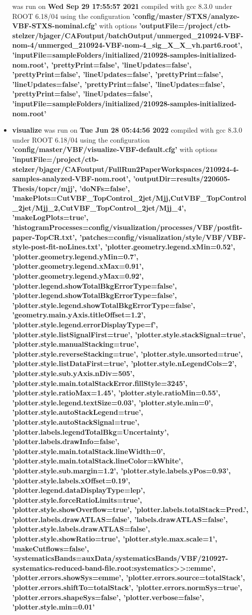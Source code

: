 \documentclass{article}
\begin{document}
\begin{itemize}
was run on \textbf{Wed Sep 29 17:55:57 2021} compiled with gcc 8.3.0 under ROOT 6.18/04 using the configuration \textbf{'config/master/STXS/analyze-VBF-STXS-nominal.cfg'} with options \textbf{'outputFile=/project/ctb-stelzer/bjager/CAFoutput/batchOutput/unmerged\_210924-VBF-nom-4/unmerged\_210924-VBF-nom-4\_sig\_X\_X\_vh.part6.root', 'inputFile=sampleFolders/initialized/210928-samples-initialized-nom.root', 'prettyPrint=false', 'lineUpdates=false', 'prettyPrint=false', 'lineUpdates=false', 'prettyPrint=false', 'lineUpdates=false', 'prettyPrint=false', 'lineUpdates=false', 'prettyPrint=false', 'lineUpdates=false', 'inputFile=sampleFolders/initialized/210928-samples-initialized-nom.root'} \item \textbf{visualize} was run on \textbf{Tue Jun 28 05:44:56 2022} compiled with gcc 8.3.0 under ROOT 6.18/04 using the configuration \textbf{'config/master/VBF/visualize-VBF-default.cfg'} with options \textbf{'inputFile=/project/ctb-stelzer/bjager/CAFoutput/FullRun2PaperWorkspaces/210924-4-samples-analyzed-VBF-nom.root', 'outputDir=results/220605-Thesis/topcr/mjj', 'doNFs=false', 'makePlots=CutVBF\_TopControl\_2jet/Mjj,CutVBF\_TopControl\_2jet/Mjj\_2,CutVBF\_TopControl\_2jet/Mjj\_4', 'makeLogPlots=true', 'histogramProcesses=config/visualization/processes/VBF/postfit-paper-TopCR.txt', 'patches=config/visualization/style/VBF/VBF-style-post-fit-noLines.txt', 'plotter.geometry.legend.xMin=0.52', 'plotter.geometry.legend.yMin=0.7', 'plotter.geometry.legend.xMax=0.91', 'plotter.geometry.legend.yMax=0.92', 'plotter.legend.showTotalBkgErrorType=false', 'plotter.legend.showTotalBkgErrorType=false', 'plotter.style.legend.showTotalBkgErrorType=false', 'geometry.main.yAxis.titleOffset=1.2', 'plotter.style.legend.errorDisplayType=f', 'plotter.style.listSignalFirst=true', 'plotter.style.stackSignal=true', 'plotter.style.manualStacking=true', 'plotter.style.reverseStacking=true', 'plotter.style.unsorted=true', 'plotter.style.listDataFirst=true', 'plotter.style.nLegendCols=2', 'plotter.style.sub.yAxis.nDiv=505', 'plotter.style.main.totalStackError.fillStyle=3245', 'plotter.style.ratioMax=1.45', 'plotter.style.ratioMin=0.55', 'plotter.style.legend.textSize=0.03', 'plotter.style.min=0', 'plotter.style.autoStackLegend=true', 'plotter.style.autoStackSignal=true', 'plotter.labels.legendTotalBkg=Uncertainty', 'plotter.labels.drawInfo=false', 'plotter.style.main.totalStack.lineWidth=0', 'plotter.style.main.totalStack.lineColor=kWhite', 'plotter.style.sub.margin=1.2', 'plotter.style.labels.yPos=0.93', 'plotter.style.labels.xOffset=0.19', 'plotter.legend.dataDisplayType=lep', 'plotter.style.forceRatioLimits=true', 'plotter.style.showOverflow=true', 'plotter.labels.totalStack=Pred.', 'plotter.labels.drawATLAS=false', 'labels.drawATLAS=false', 'plotter.style.labels.drawATLAS=false', 'plotter.style.showRatio=true', 'plotter.style.max.scale=1', 'makeCutflows=false', 'systematicsBands=auxData/systematicsBands/VBF/210927-systematics-reduced-band-file.root:systematics>>::emme', 'plotter.errors.showSys=emme', 'plotter.errors.source=totalStack', 'plotter.errors.shiftTo=totalStack', 'plotter.errors.normSys=true', 'plotter.errors.shapeSys=false', 'plotter.verbose=false', 'plotter.style.min=0.01'} \end{itemize}
\end{document}
